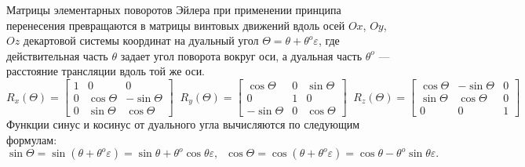 \documentclass[%
]{ittmm}
\begin{document}
Матрицы элементарных поворотов Эйлера при применении принципа перенесения превращаются в матрицы винтовых движений вдоль осей $Ox$, $Oy$, $Oz$ декартовой системы координат на дуальный угол $\Theta = \theta + \theta^o \varepsilon$, где действительная часть $\theta$ задает угол поворота вокруг оси, а дуальная часть $\theta^o$ — расстояние трансляции вдоль той же оси.
\begin{equation*}
  R_x(\Theta) = 
  \begin{bmatrix}
    1 & 0 & 0\\
    0 & \cos{\Theta} & -\sin{\Theta}\\
    0 & \sin{\Theta} & \cos{\Theta}
  \end{bmatrix}
  \;\;
  R_y(\Theta) = 
  \begin{bmatrix}
    \cos\Theta & 0 & \sin\Theta\\
    0 & 1 & 0\\
    -\sin\Theta & 0 & \cos\Theta
  \end{bmatrix}
  \;\;
  R_z(\Theta) = 
  \begin{bmatrix}
    \cos\Theta & -\sin\Theta & 0\\
    \sin\Theta & \cos\Theta & 0\\
    0 & 0 & 1
  \end{bmatrix}
\end{equation*}
Функции синус и косинус от дуального угла вычисляются по следующим формулам:
\begin{equation*}
  \sin\Theta = \sin(\theta + \theta^o \varepsilon) = \sin\theta + \theta^o \cos\theta \varepsilon,\;\;
  \cos\Theta = \cos(\theta + \theta^o \varepsilon) = \cos\theta - \theta^o \sin\theta \varepsilon.
\end{equation*}
\end{document}
